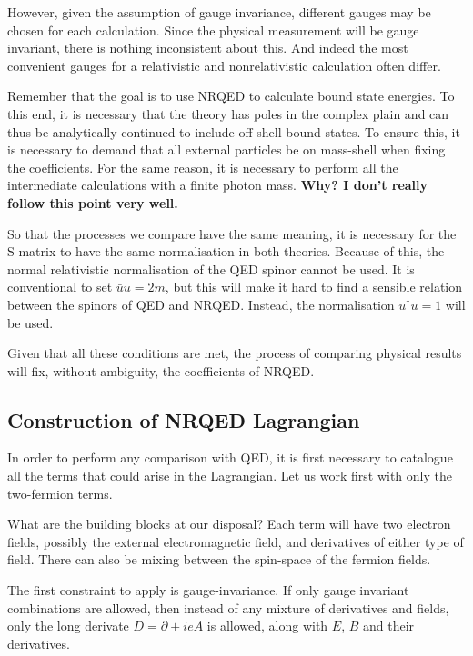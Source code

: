 However, given the assumption of gauge invariance, different gauges may be chosen for each calculation.  Since the physical measurement will be gauge invariant, there is nothing inconsistent about this.  And indeed the most convenient gauges for a relativistic and nonrelativistic calculation often differ.

Remember that the goal is to use NRQED to calculate bound state energies.  To this end, it is necessary that the theory has poles in the complex plain and can thus be analytically continued to include off-shell bound states.  To ensure this, it is necessary to demand that all external particles be on mass-shell when fixing the coefficients.  For the same reason, it is necessary to perform all the intermediate calculations with a finite photon mass.  {\bf Why? I don't really follow this point very well.}
 
So that the processes we compare have the same meaning, it is necessary for the S-matrix to have the same normalisation in both theories.  Because of this, the normal relativistic normalisation of the QED spinor cannot be used.  It is conventional to set $\bar{u} u = 2m$, but this will make it hard to find a sensible relation between the spinors of QED and NRQED.  Instead, the normalisation $u^\dagger u = 1$ will be used.

Given that all these conditions are met, the process of comparing physical results will fix, without ambiguity, the coefficients of NRQED.   

\subsection{Construction of NRQED Lagrangian}

In order to perform any comparison with QED, it is first necessary to catalogue all the terms that could arise in the Lagrangian.  Let us work first with only the two-fermion terms.

What are the building blocks at our disposal?  Each term will have two electron fields, possibly the external electromagnetic field, and derivatives of either type of field.  There can also be mixing between the spin-space of the fermion fields.

The first constraint to apply is gauge-invariance.  If only gauge invariant combinations are allowed, then instead of any mixture of derivatives and fields, only the long derivate $D = \partial + ieA$ is allowed, along with $E$, $B$ and their derivatives.

